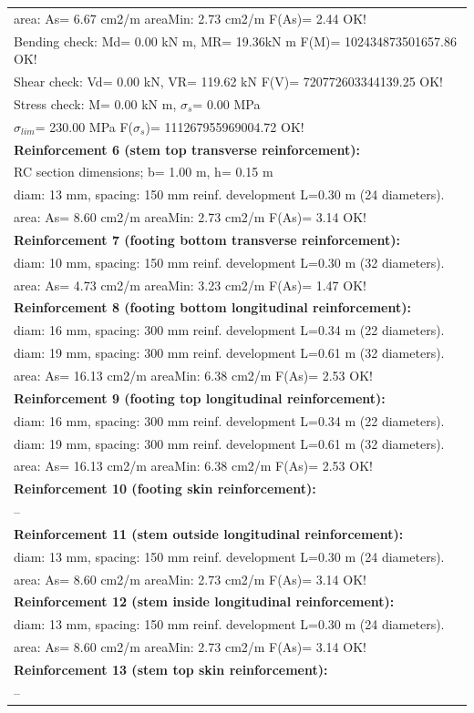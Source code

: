 \begin{center}
\begin{supertabular}[H]{|l|}
  area: As=   6.67 cm2/m areaMin:   2.73 cm2/m  F(As)= 2.44 OK!\\
  Bending check: Md=   0.00 kN m, MR=  19.36kN m  F(M)= 102434873501657.86 OK!\\
  Shear check: Vd=   0.00 kN,  VR= 119.62 kN  F(V)= 720772603344139.25 OK!\\
  Stress check: M=   0.00 kN m, $\sigma_s$=   0.00 MPa\\
    $\sigma_{lim}$= 230.00 MPa  F($\sigma_s$)= 111267955969004.72 OK!\\
\textbf{Reinforcement 6 (stem top transverse reinforcement):}\\
  RC section dimensions; b= 1.00 m, h= 0.15 m\\
  diam: 13 mm, spacing: 150 mm  reinf. development L=0.30 m (24 diameters).\\
  area: As=   8.60 cm2/m areaMin:   2.73 cm2/m  F(As)= 3.14 OK!\\
\textbf{Reinforcement 7 (footing bottom transverse reinforcement):}\\
  diam: 10 mm, spacing: 150 mm  reinf. development L=0.30 m (32 diameters).\\
  area: As=   4.73 cm2/m areaMin:   3.23 cm2/m  F(As)= 1.47 OK!\\
\textbf{Reinforcement 8 (footing bottom longitudinal reinforcement):}\\
  diam: 16 mm, spacing: 300 mm  reinf. development L=0.34 m (22 diameters).\\
  diam: 19 mm, spacing: 300 mm  reinf. development L=0.61 m (32 diameters).\\
  area: As=  16.13 cm2/m areaMin:   6.38 cm2/m  F(As)= 2.53 OK!\\
\textbf{Reinforcement 9 (footing top longitudinal reinforcement):}\\
  diam: 16 mm, spacing: 300 mm  reinf. development L=0.34 m (22 diameters).\\
  diam: 19 mm, spacing: 300 mm  reinf. development L=0.61 m (32 diameters).\\
  area: As=  16.13 cm2/m areaMin:   6.38 cm2/m  F(As)= 2.53 OK!\\
\textbf{Reinforcement 10 (footing skin reinforcement):}\\
  --\\
\textbf{Reinforcement 11 (stem outside longitudinal reinforcement):}\\
  diam: 13 mm, spacing: 150 mm  reinf. development L=0.30 m (24 diameters).\\
  area: As=   8.60 cm2/m areaMin:   2.73 cm2/m  F(As)= 3.14 OK!\\
\textbf{Reinforcement 12 (stem inside longitudinal reinforcement):}\\
  diam: 13 mm, spacing: 150 mm  reinf. development L=0.30 m (24 diameters).\\
  area: As=   8.60 cm2/m areaMin:   2.73 cm2/m  F(As)= 3.14 OK!\\
\textbf{Reinforcement 13 (stem top skin reinforcement):}\\
  --\\
\hline
\end{supertabular}
\end{center}
